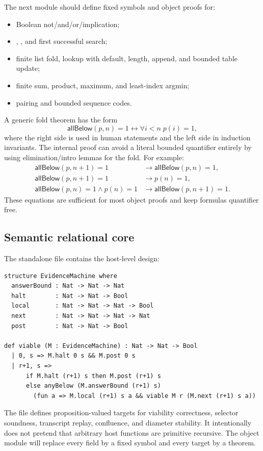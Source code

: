 The next module should define fixed symbols and object proofs for:
\begin{itemize}
\item Boolean not/and/or/implication;
\item {}, , and first successful search;
\item finite list fold, lookup with default, length, append, and bounded table update;
\item finite sum, product, maximum, and least-index argmin;
\item pairing and bounded sequence codes.
\end{itemize}

A generic fold theorem has the form
\[
 \mathsf{allBelow}(p,n)=1
 \leftrightarrow \forall i<n\;p(i)=1,
\]
where the right side is used in human statements and the left side in induction invariants.  The internal proof can avoid a literal bounded quantifier entirely by using elimination/intro lemmas for the fold.  For example:
\begin{align*}
 \mathsf{allBelow}(p,n+1)=1&\to\mathsf{allBelow}(p,n)=1,\\
 \mathsf{allBelow}(p,n+1)=1&\to p(n)=1,\\
 \mathsf{allBelow}(p,n)=1\wedge p(n)=1&\to
   \mathsf{allBelow}(p,n+1)=1.
\end{align*}
These equations are sufficient for most object proofs and keep formulas quantifier free.

\subsection{Semantic relational core}

The standalone file  contains the host-level design:

\begin{lstlisting}
structure EvidenceMachine where
  answerBound : Nat -> Nat -> Nat
  halt        : Nat -> Nat -> Bool
  local       : Nat -> Nat -> Nat -> Bool
  next        : Nat -> Nat -> Nat -> Nat
  post        : Nat -> Nat -> Bool

def viable (M : EvidenceMachine) : Nat -> Nat -> Bool
  | 0, s => M.halt 0 s && M.post 0 s
  | r+1, s =>
      if M.halt (r+1) s then M.post (r+1) s
      else anyBelow (M.answerBound (r+1) s)
        (fun a => M.local (r+1) s a && viable M r (M.next (r+1) s a))
\end{lstlisting}

The file defines proposition-valued targets for viability correctness, selector soundness, transcript replay, confluence, and diameter stability.  It intentionally does not pretend that arbitrary host functions are primitive recursive.  The object module will replace every field by a fixed  symbol and every target by a  theorem.

